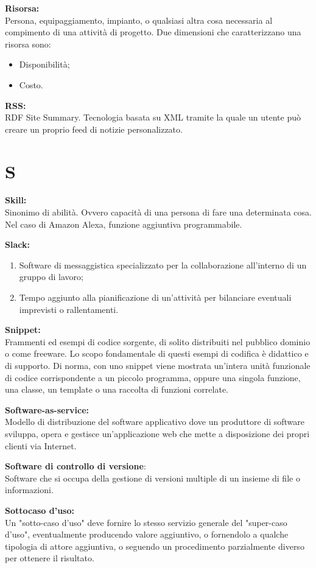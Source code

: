 \documentclass[a4paper, oneside, openany, dvipsnames, table]{article}
\begin{document}
\textbf{Risorsa:}\\	Persona, equipaggiamento, impianto, o qualsiasi altra cosa necessaria al compimento di una attività di progetto. Due dimensioni che caratterizzano una risorsa sono:
\begin{itemize}
\item Disponibilità;
\item Costo.
\end{itemize} 

\textbf{RSS:}\\	RDF Site Summary. Tecnologia basata su XML tramite la quale un utente può creare un proprio feed di notizie personalizzato.
\newpage
\section{S}
\textbf{Skill:}\\	Sinonimo di abilità. Ovvero capacità di una persona di fare una determinata cosa. Nel caso di Amazon Alexa, funzione aggiuntiva programmabile.

\textbf{Slack:}
\begin{enumerate}
	\item Software di messaggistica specializzato per la collaborazione all'interno di un gruppo di lavoro;
	\item Tempo aggiunto alla pianificazione di un'attività per bilanciare eventuali imprevisti o rallentamenti.
\end{enumerate} 

\textbf{Snippet:}\\	Frammenti ed esempi di codice sorgente, di solito distribuiti nel 
pubblico dominio o come freeware. Lo scopo fondamentale di questi esempi di codifica è 
didattico e di supporto. Di norma, con uno snippet viene mostrata un'intera unità funzionale 
di codice corrispondente a un piccolo programma, oppure una singola funzione, una classe, 
un template o una raccolta di funzioni correlate.

\textbf{Software-as-service:}\\	Modello di distribuzione del software applicativo dove un produttore di software sviluppa, opera e gestisce un'applicazione web che mette a disposizione dei propri clienti via Internet.

\textbf{Software di controllo di versione}:\\ Software che si occupa della  gestione di versioni multiple di un insieme di file o informazioni.

\textbf{Sottocaso d'uso:}\\
Un "sotto-caso d'uso" deve fornire lo stesso servizio generale del "super-caso d'uso", eventualmente producendo valore aggiuntivo, o fornendolo a qualche tipologia di attore aggiuntiva, o seguendo un procedimento parzialmente diverso per ottenere il risultato.
\end{document}
